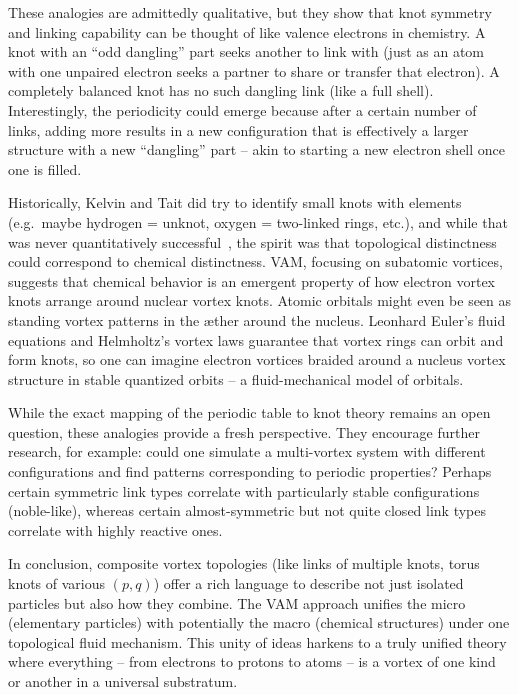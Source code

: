 \documentclass[a4paper,12pt]{article}
\begin{document}
        These analogies are admittedly qualitative, but they show that knot symmetry and linking capability can be thought of like valence electrons in chemistry. A knot with an ``odd dangling'' part seeks another to link with (just as an atom with one unpaired electron seeks a partner to share or transfer that electron). A completely balanced knot has no such dangling link (like a full shell). Interestingly, the periodicity could emerge because after a certain number of links, adding more results in a new configuration that is effectively a larger structure with a new ``dangling'' part -- akin to starting a new electron shell once one is filled.

        Historically, Kelvin and Tait did try to identify small knots with elements (e.g.\ maybe hydrogen = unknot, oxygen = two-linked rings, etc.), and while that was never quantitatively successful~\cite{kelvin1867}, the spirit was that topological distinctness could correspond to chemical distinctness. VAM, focusing on subatomic vortices, suggests that chemical behavior is an emergent property of how electron vortex knots arrange around nuclear vortex knots. Atomic orbitals might even be seen as standing vortex patterns in the æther around the nucleus. Leonhard Euler's fluid equations and Helmholtz's vortex laws guarantee that vortex rings can orbit and form knots, so one can imagine electron vortices braided around a nucleus vortex structure in stable quantized orbits -- a fluid-mechanical model of orbitals.
        
        While the exact mapping of the periodic table to knot theory remains an open question, these analogies provide a fresh perspective. They encourage further research, for example: could one simulate a multi-vortex system with different configurations and find patterns corresponding to periodic properties? Perhaps certain symmetric link types correlate with particularly stable configurations (noble-like), whereas certain almost-symmetric but not quite closed link types correlate with highly reactive ones.
        
        In conclusion, composite vortex topologies (like links of multiple knots, torus knots of various $(p,q)$) offer a rich language to describe not just isolated particles but also how they combine. The VAM approach unifies the micro (elementary particles) with potentially the macro (chemical structures) under one topological fluid mechanism. This unity of ideas harkens to a truly unified theory where everything -- from electrons to protons to atoms -- is a vortex of one kind or another in a universal substratum.
        
\end{document}

